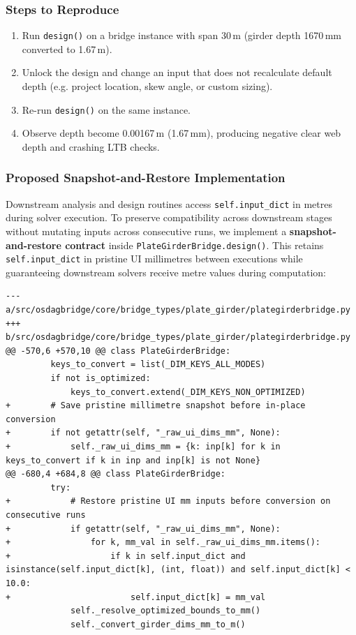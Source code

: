 \documentclass[11pt,a4paper]{article}
\begin{document}
\subsubsection*{Steps to Reproduce}
\begin{enumerate}
    \item Run \texttt{design()} on a bridge instance with span 30\,m (girder depth 1670\,mm converted to 1.67\,m).
    \item Unlock the design and change an input that does not recalculate default depth (e.g. project location, skew angle, or custom sizing).
    \item Re-run \texttt{design()} on the same instance.
    \item Observe depth become 0.00167\,m (1.67\,mm), producing negative clear web depth and crashing LTB checks.
\end{enumerate}

\subsubsection*{Proposed Snapshot-and-Restore Implementation}
Downstream analysis and design routines access \texttt{self.input\_dict} in metres during solver execution. To preserve compatibility across downstream stages without mutating inputs across consecutive runs, we implement a \textbf{snapshot-and-restore contract} inside \texttt{PlateGirderBridge.design()}. This retains \texttt{self.input\_dict} in pristine UI millimetres between executions while guaranteeing downstream solvers receive metre values during computation:

\begin{lstlisting}
--- a/src/osdagbridge/core/bridge_types/plate_girder/plategirderbridge.py
+++ b/src/osdagbridge/core/bridge_types/plate_girder/plategirderbridge.py
@@ -570,6 +570,10 @@ class PlateGirderBridge:
         keys_to_convert = list(_DIM_KEYS_ALL_MODES)
         if not is_optimized:
             keys_to_convert.extend(_DIM_KEYS_NON_OPTIMIZED)
+        # Save pristine millimetre snapshot before in-place conversion
+        if not getattr(self, "_raw_ui_dims_mm", None):
+            self._raw_ui_dims_mm = {k: inp[k] for k in keys_to_convert if k in inp and inp[k] is not None}
@@ -680,4 +684,8 @@ class PlateGirderBridge:
         try:
+            # Restore pristine UI mm inputs before conversion on consecutive runs
+            if getattr(self, "_raw_ui_dims_mm", None):
+                for k, mm_val in self._raw_ui_dims_mm.items():
+                    if k in self.input_dict and isinstance(self.input_dict[k], (int, float)) and self.input_dict[k] < 10.0:
+                        self.input_dict[k] = mm_val
             self._resolve_optimized_bounds_to_mm()
             self._convert_girder_dims_mm_to_m()
\end{lstlisting}
\end{document}

